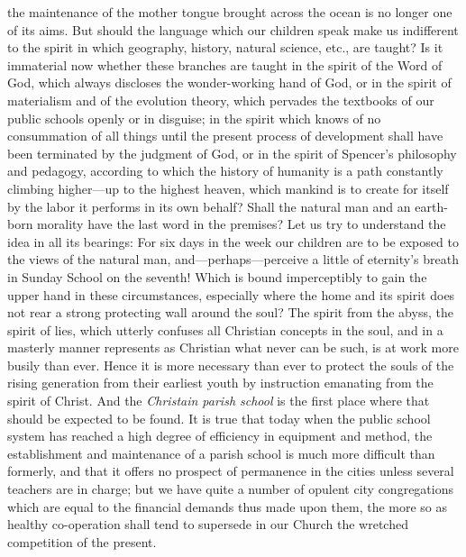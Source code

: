 the maintenance of the mother tongue brought across the ocean is no longer one of its aims. But should the language which our children speak make us indifferent to the spirit in which geography, history, natural science, etc., are taught? Is it immaterial now whether these branches are taught in the spirit of the Word of God, which always discloses the wonder-working hand of God, or in the spirit of materialism and of the evolution theory, which pervades the textbooks of our public schools openly or in disguise; in the spirit which knows of no consummation of all things until the present process of development shall have been terminated by the judgment of God, or in the spirit of Spencer’s philosophy and pedagogy, according to which the history of humanity is a path constantly climbing higher—up to the highest heaven, which mankind is to create for itself by the labor it performs in its own behalf? Shall the natural man and an earth-born morality have the last word in the premises? Let us try to understand the idea in all its bearings: For six days in the week our children are to be exposed to the views of the natural man, and—perhaps—perceive a little of eternity’s breath in Sunday School on the seventh! Which is bound imperceptibly to gain the upper hand in these circumstances, especially where the home and its spirit does not rear a strong protecting wall around the soul? The spirit from the abyss, the spirit of lies, which utterly confuses all Christian concepts in the soul, and in a masterly manner represents as Christian what never can be such, is at work more busily than ever. Hence it is more necessary than ever to protect the souls of the rising generation from their earliest youth by instruction emanating from the spirit of Christ. And the \emph{Christain parish school} is the first place where that should be expected to be found. It is true that today when the public school system has reached a high degree of efficiency in equipment and method,
the establishment and maintenance of a parish school is much more difficult than formerly, and that it offers no prospect of permanence in the cities unless several teachers are in charge; but we have quite a number of opulent city congregations which are equal to the financial demands thus made upon them, the more so as healthy co-operation shall tend to supersede in our Church the wretched competition of the present.

